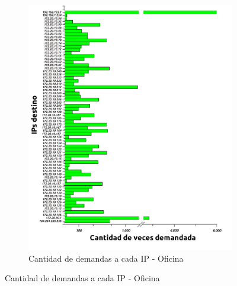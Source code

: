 \begin{figure}[H]
\begin{subfigure}[H]{0.5\textwidth}
                \includegraphics[width=1\textwidth]{graficos/cantidadConsultasOficina.pdf}
                \caption{Cantidad de demandas a cada IP - Oficina}
                \label{fig:hist2}
        \end{subfigure}
\end{figure}


